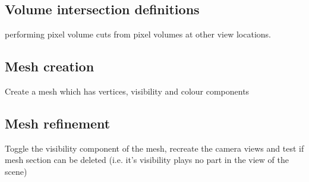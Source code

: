 \documentclass[11pt]{article}
\begin{document}
	\subsection{Volume intersection definitions} 
		performing pixel volume cuts from pixel volumes at other view locations. 

	\subsection{Mesh creation}
		Create a mesh which has vertices, visibility and colour components

	\subsection{Mesh refinement}
		Toggle the visibility component of the mesh, recreate the camera views and test if mesh section can be deleted (i.e. it's visibility plays no part in the view of the scene)
\end{document}

